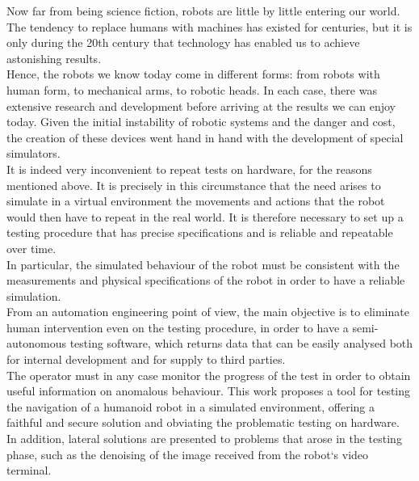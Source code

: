 Now far from being science fiction, robots are little by little entering our world. The tendency to replace humans with machines has existed for centuries, but it is only during the 20th century that technology has enabled us to achieve astonishing results.\\
Hence, the robots we know today come in different forms: from robots with human form, to mechanical arms, to robotic heads. 
In each case, there was extensive research and development before arriving at the results we can enjoy today.
Given the initial instability of robotic systems and the danger and cost, the creation of these devices went hand in hand with the development of special simulators. \\
It is indeed very inconvenient to repeat tests on hardware, for the reasons mentioned above. It is precisely in this circumstance that the need arises to simulate in a virtual environment the movements and actions that the robot would then have to repeat in the real world.
It is therefore necessary to set up a testing procedure that has precise specifications and is reliable and repeatable over time. \\
In particular, the simulated behaviour of the robot must be consistent with the measurements and physical specifications of the robot in order to have a reliable simulation.\\
From an automation engineering point of view, the main objective is to eliminate human intervention even on the testing procedure, in order to have a semi-autonomous testing software, which returns data that can be easily analysed both for internal development and for supply to third parties.\\
The operator must in any case monitor the progress of the test in order to obtain useful information on anomalous behaviour. 
This work proposes a tool for testing the navigation of a humanoid robot in a simulated environment, offering a faithful and secure solution and obviating the problematic testing on hardware.\\
In addition, lateral solutions are presented to problems that arose in the testing phase, such as the denoising of the image received from the robot`s video terminal.\\

